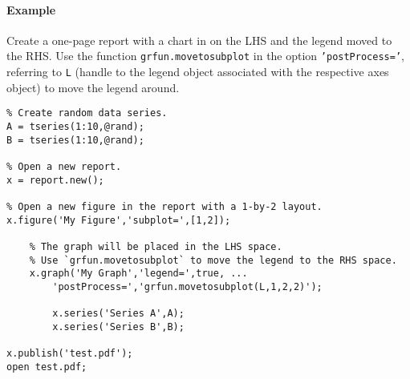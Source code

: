 \paragraph{Example}

Create a one-page report with a chart in on the LHS and the legend moved
to the RHS. Use the function \texttt{grfun.movetosubplot} in the option
\texttt{'postProcess='}, referring to \texttt{L} (handle to the legend
object associated with the respective axes object) to move the legend
around.

\begin{verbatim}
% Create random data series.
A = tseries(1:10,@rand);
B = tseries(1:10,@rand);

% Open a new report.
x = report.new();

% Open a new figure in the report with a 1-by-2 layout.
x.figure('My Figure','subplot=',[1,2]);

    % The graph will be placed in the LHS space.
    % Use `grfun.movetosubplot` to move the legend to the RHS space.
    x.graph('My Graph','legend=',true, ...
        'postProcess=','grfun.movetosubplot(L,1,2,2)');

        x.series('Series A',A);
        x.series('Series B',B);

x.publish('test.pdf');
open test.pdf;
\end{verbatim}


